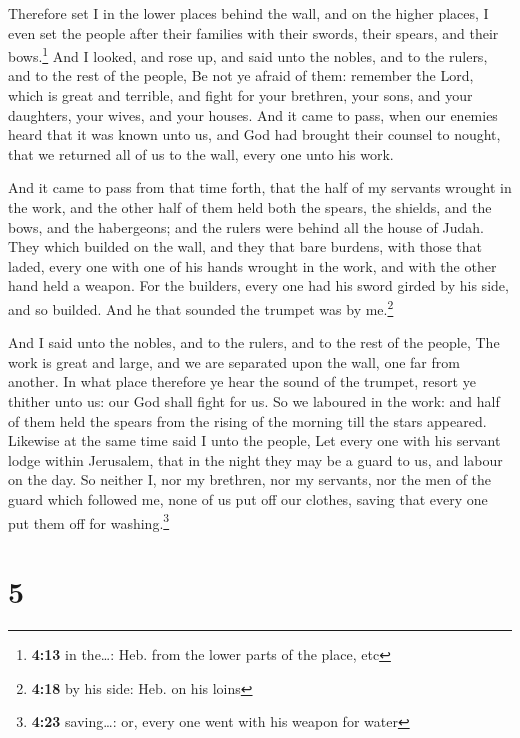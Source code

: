 Therefore set I in the lower places behind the wall, and
on the higher places, I even set the people after their families with
their swords, their spears, and their bows.\footnote{\textbf{4:13} in
  the\ldots: Heb. from the lower parts of the place, etc}
 And I looked, and rose up, and said unto the nobles, and
to the rulers, and to the rest of the people, Be not ye afraid of them:
remember the Lord, which is great and terrible, and fight for your
brethren, your sons, and your daughters, your wives, and your houses.
 And it came to pass, when our enemies heard that it was
known unto us, and God had brought their counsel to nought, that we
returned all of us to the wall, every one unto his work.

 And it came to pass from that time forth, that the half
of my servants wrought in the work, and the other half of them held both
the spears, the shields, and the bows, and the habergeons; and the
rulers were behind all the house of Judah.  They which
builded on the wall, and they that bare burdens, with those that laded,
every one with one of his hands wrought in the work, and with the other
hand held a weapon.  For the builders, every one had his
sword girded by his side, and so builded. And he that sounded the
trumpet was by me.\footnote{\textbf{4:18} by his side: Heb. on his loins}

 And I said unto the nobles, and to the rulers, and to
the rest of the people, The work is great and large, and we are
separated upon the wall, one far from another.  In what
place therefore ye hear the sound of the trumpet, resort ye thither unto
us: our God shall fight for us.  So we laboured in the
work: and half of them held the spears from the rising of the morning
till the stars appeared.  Likewise at the same time said
I unto the people, Let every one with his servant lodge within
Jerusalem, that in the night they may be a guard to us, and labour on
the day.  So neither I, nor my brethren, nor my servants,
nor the men of the guard which followed me, none of us put off our
clothes, saving that every one put them off for washing.\footnote{\textbf{4:23}
  saving\ldots: or, every one went with his weapon for water}

\hypertarget{section-4}{%
\section{5}\label{section-4}}

